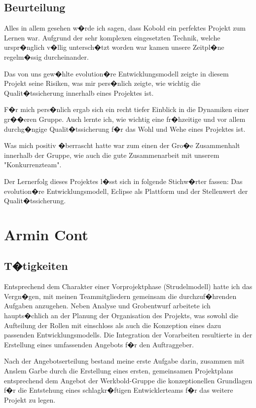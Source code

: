 \documentclass[a4paper,titlepage,12pt,ngerman]{scrbook}
\begin{document}
\subsection{Beurteilung}
Alles in allem gesehen w�rde ich sagen, dass Kobold ein perfektes Projekt
zum Lernen war. Aufgrund der sehr komplexen eingesetzten Technik, welche
urspr�nglich v�llig untersch�tzt worden war kamen unsere Zeitpl�ne
regelm�ssig durcheinander.\par
Das von uns gew�hlte evolution�re Entwicklungsmodell zeigte in diesem
Projekt seine Risiken, was mir pers�nlich zeigte, wie wichtig die
Qualit�tssicherung innerhalb eines Projektes ist.\par
F�r mich pers�nlich ergab sich ein recht tiefer Einblick in die Dynamiken
einer gr��eren Gruppe. Auch lernte ich, wie wichtig eine fr�hzeitige und vor
allem durchg�ngige Qualit�tssicherung f�r das Wohl und Wehe eines Projektes
ist. \par
Was mich positiv �berrascht hatte war zum einen der Gro�e Zusammenhalt
innerhalb der Gruppe, wie auch die gute Zusammenarbeit mit unserem
"Konkurrenzteam".\par
Der Lernerfolg dieses Projektes l�sst sich in folgende Stichw�rter fassen:
Das evolution�re Entwicklungsmodell, Eclipse als Plattform und der
Stellenwert der Qualit�tssicherung.


\section{Armin Cont}


\subsection{T�tigkeiten}

Entsprechend dem Charakter einer Vorprojektphase (Strudelmodell) hatte ich das
Vergn�gen, mit meinen Teammitgliedern gemeinsam die durchzuf�hrenden Aufgaben 
anzugehen. Neben Analyse und Grobentwurf arbeitete ich haupts�chlich an der 
Planung der Organisation des Projekts, was sowohl die Aufteilung der Rollen 
mit einschloss als auch die Konzeption eines dazu passenden Entwicklungsmodells.
Die Integration der Vorarbeiten resultierte in der Erstellung eines umfassenden
Angebots f�r den Auftraggeber.\par

Nach der Angebotserteilung bestand meine erste Aufgabe darin, zusammen mit Anslem
Garbe durch die Erstellung eines ersten, gemeinsamen Projektplans entsprechend dem 
Angebot der Werkbold-Gruppe die konzeptionellen Grundlagen f�r die Entstehung eines 
schlagkr�ftigen Entwicklerteams f�r das weitere Projekt zu legen.\par
\end{document}
